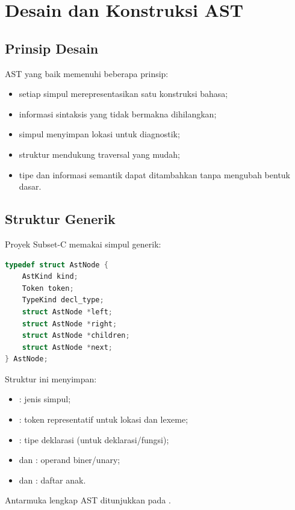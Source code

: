 \section{Desain dan Konstruksi AST}
\label{sec:ch16-desain}

\subsection{Prinsip Desain}

AST yang baik memenuhi beberapa prinsip:
\begin{itemize}[leftmargin=*]
  \item setiap simpul merepresentasikan satu konstruksi bahasa;
  \item informasi sintaksis yang tidak bermakna dihilangkan;
  \item simpul menyimpan lokasi untuk diagnostik;
  \item struktur mendukung traversal yang mudah;
  \item tipe dan informasi semantik dapat ditambahkan tanpa mengubah
        bentuk dasar.
\end{itemize}

\subsection{Struktur Generik}

Proyek Subset-C memakai simpul generik:
\begin{lstlisting}[language=C]
typedef struct AstNode {
    AstKind kind;
    Token token;
    TypeKind decl_type;
    struct AstNode *left;
    struct AstNode *right;
    struct AstNode *children;
    struct AstNode *next;
} AstNode;
\end{lstlisting}

Struktur ini menyimpan:
\begin{itemize}[leftmargin=*]
  \item {}: jenis simpul;
  \item {}: token representatif untuk lokasi dan lexeme;
  \item {}: tipe deklarasi (untuk deklarasi/fungsi);
  \item {} dan : operand biner/unary;
  \item {} dan : daftar anak.
\end{itemize}

Antarmuka lengkap AST ditunjukkan pada .

